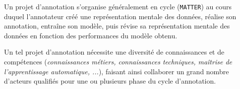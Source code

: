 	
	\begin{leftBarSummary}
		\begin{todolist}
			\item[\itemok] Un projet d'annotation s'organise généralement en cycle (\texttt{MATTER}) au cours duquel l'annotateur créé une représentation mentale des données, réalise son annotation, entraîne son modèle, puis révise sa représentation mentale des données en fonction des performances du modèle obtenu.
			\item[\itemok] Un tel projet d'annotation nécessite une diversité de connaissances et de compétences (\textit{connaissances métiers, connaissances techniques, maîtrise de l'apprentissage automatique, ...}), faisant ainsi collaborer un grand nombre d'acteurs qualifiés pour une ou plusieurs phase du cycle d'annotation.
		\end{todolist}
	\end{leftBarSummary}